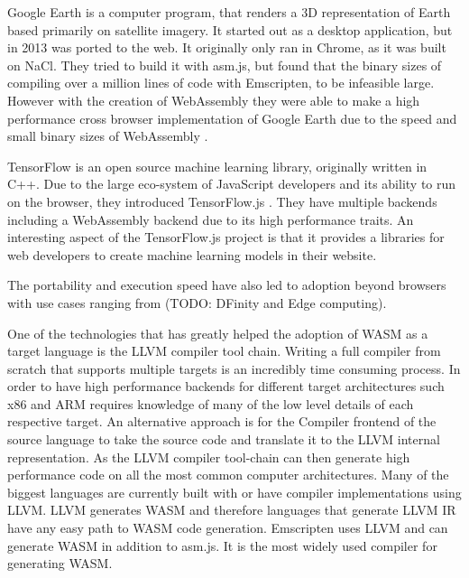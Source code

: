 \documentclass[11pt]{book}
\begin{document}
Google Earth\cite{google-earth-history} is a computer program, that renders a 3D representation of Earth based primarily on satellite imagery. It started out as a desktop application, but in 2013 was ported to the web. It originally only ran in Chrome, as it was built on NaCl. They tried to build it with asm.js, but found that the binary sizes of compiling over a million lines of code with Emscripten, to be infeasible large. However with the creation of WebAssembly they were able to make a high performance cross browser implementation of Google Earth due to the speed and small binary sizes of WebAssembly \cite{google-earth}.

TensorFlow \cite{tensorflow} is an open source machine learning library, originally written in C++. Due to the large eco-system of JavaScript developers and its ability to run on the browser, they introduced TensorFlow.js \cite{tensorflowjs}. They have multiple backends including a WebAssembly backend due to its high performance traits. An interesting aspect of the TensorFlow.js project is that it provides a libraries for web developers to create machine learning models in their website. 

The portability and execution speed have also led to adoption beyond browsers with use cases ranging from (TODO: DFinity and Edge computing). 


One of the technologies that has greatly helped the adoption of WASM as a target language is the LLVM \cite{llvm} compiler tool chain. Writing a full compiler from scratch that supports multiple targets is an incredibly time consuming process. In order to have high performance backends for different target architectures such x86 and ARM requires knowledge of many of the low level details of each respective target. An alternative approach is for the Compiler frontend of the source language to take the source code and translate it to the LLVM internal representation. As the LLVM compiler tool-chain can then generate high performance code on all the most common computer architectures. Many of the biggest languages are currently built with or have compiler implementations using LLVM.
LLVM generates WASM and therefore languages that generate LLVM IR have any easy path to WASM code generation. 
Emscripten uses LLVM and can generate WASM in addition to asm.js. It is the most widely used compiler for generating WASM.
\end{document}
